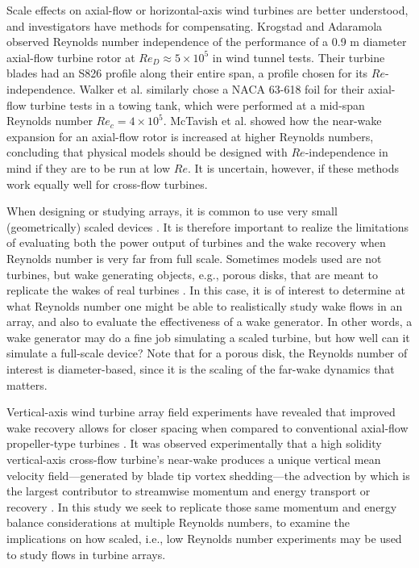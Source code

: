 \documentclass[energies,article,accept,moreauthors,pdftex,12pt,a4paper]{mdpi}
\begin{document}
Scale effects on axial-flow or horizontal-axis wind turbines are better
understood, and investigators have methods for compensating. Krogstad and
Adaramola \cite{Krogstad2012a} observed Reynolds number independence of the
performance of a 0.9 m diameter axial-flow turbine rotor at $Re_D \approx 5
\times 10^5$ in wind tunnel tests. Their turbine blades had an S826 profile
along their entire span, a profile chosen for its $Re$-independence. Walker et
al. \cite{Walker2014} similarly chose a NACA 63-618 foil for their axial-flow
turbine tests in a towing tank, which were performed at a mid-span Reynolds
number $Re_c = 4 \times 10^5$. McTavish et al. \cite{McTavish2013} showed how
the near-wake expansion for an axial-flow rotor is increased at higher Reynolds
numbers, concluding that physical models should be designed with
$Re$-independence in mind if they are to be run at low $Re$. It is uncertain,
however, if these methods work equally well for cross-flow turbines.

When designing or studying arrays, it is common to use very small
(geometrically) scaled devices \cite{Chamorro2011, Chamorro2011b}. It is
therefore important to realize the limitations of evaluating both the power
output of turbines and the wake recovery when Reynolds number is very far from
full scale. Sometimes models used are not turbines, but wake generating objects,
e.g., porous disks, that are meant to replicate the wakes of real turbines
\cite{Goldenberg1983}. In this case, it is of interest to determine at what
Reynolds number one might be able to realistically study wake flows in an array,
and also to evaluate the effectiveness of a wake generator. In other words, a
wake generator may do a fine job simulating a scaled turbine, but how well can
it simulate a full-scale device? Note that for a porous disk, the Reynolds
number of interest is diameter-based, since it is the scaling of the far-wake
dynamics that matters.

Vertical-axis wind turbine array field experiments have revealed that improved
wake recovery allows for closer spacing when compared to conventional axial-flow
propeller-type turbines \cite{Dabiri2011, Kinzel2012}. It was observed
experimentally that a high solidity vertical-axis cross-flow turbine's near-wake
produces a unique vertical mean velocity field---generated by blade tip vortex
shedding---the advection by which is the largest contributor to streamwise
momentum and energy transport or recovery \cite{Bachant2015-JoT}. In this study
we seek to replicate those same momentum and energy balance considerations at
multiple Reynolds numbers, to examine the implications on how scaled, i.e., low
Reynolds number experiments may be used to study flows in turbine arrays.
\end{document}
